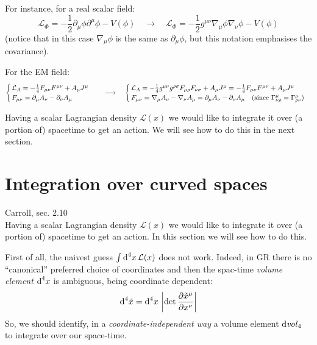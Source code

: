 \documentclass[../main/main.tex]{subfiles}
\begin{document}
For instance, for a real scalar field:
\[\mathcal L_\Phi=-\frac12\partial_\mu\phi\partial^\mu\phi-V(\phi)\quad\longrightarrow\quad\mathcal L_\Phi=-\frac12g^{\mu\nu}\nabla_\mu\phi\nabla_\nu\phi-V(\phi)\]
(notice that in this case $\nabla_\mu\phi$ is the same as $\partial_\mu\phi$, but this notation emphasises the covariance). 

For the EM field:
\[
\begin{cases}\mathcal L_A=-\frac14F_{\mu\nu}F^{\mu\nu}+A_\mu J^\mu\\
F_{\mu\nu}=\partial_\mu A_\nu-\partial_\nu A_\mu
\end{cases}
\quad\longrightarrow\quad
\begin{cases}\mathcal L_A=-\frac14g^{\mu \nu}g^{\rho \sigma} F_{\mu\rho}F_{\nu\sigma}+A_\mu J^\mu=-\frac14F_{\mu\nu}F^{\mu\nu}+A_\mu J^\mu\\
F_{\mu\nu}=\nabla_\mu A_\nu-\nabla_\nu A_\mu=\partial_\mu A_\nu-\partial_\nu A_\mu\quad(\text{since }{\Gamma}^{\mu}_{\nu \rho}={\Gamma}^{\mu}_{\rho \nu})
\end{cases}\]

Having a scalar Lagrangian density $\mathcal L(x)$ we would like to integrate it over (a portion of) spacetime to get an action. We will see how to do this in the next section. 

\section{Integration over curved spaces}\label{sec:integr-curv-space}

\newcommand{\volelem}[1]{\text{d\emph{vol}}_{#1}}

\textsf{Carroll, sec. 2.10}\\

Having a scalar Lagrangian density $\mathcal L(x)$ we would like to integrate it over (a portion of) spacetime to get an action. In this section we will see how to do this. 

First of all, the naivest guess $\int\textup{d}^4x\,\mathcal L(x)$ does not work. Indeed, in GR there is no ``canonical'' preferred choice of coordinates and then the spac-time \emph{volume element} $\textup{d}^4x$ is ambiguous, being coordinate dependent:
\[\textup{d}^4\tilde x=\textup{d}^4x\,\left\vert\det\frac{\partial \tilde x^\mu}{\partial x^\nu}\right\vert\]
So, we should identify, in a \emph{coordinate-independent way} a volume element $\volelem4$ to integrate over our space-time. 
\end{document}
